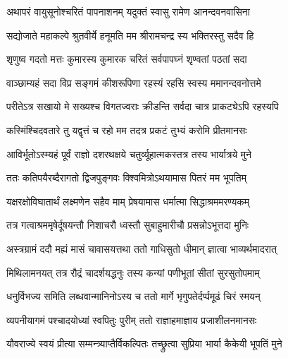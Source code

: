 

\translink{}

\storymeta



\twolineshloka
{अथापरं वायुसूनोश्चरितं पापनाशनम्}
{यदुक्तं स्वासु रामेण आनन्दवनवासिना}%

\twolineshloka
{सद्योजाते महाकल्पे श्रुतवीर्ये हनूमति}
{मम श्रीरामचन्द्र स्य भक्तिरस्तु सदैव हि}%

\twolineshloka
{शृणुष्व गदतो मत्तः कुमारस्य कुमारक}
{चरितं सर्वपापघ्नं शृण्वतां पठतां सदा}%

\twolineshloka
{वाञ्छाम्यहं सदा विप्र सङ्गमं कीशरूपिणा}
{रहस्यं रहसि स्वस्य ममानन्दवनोत्तमे}%

\twolineshloka
{परीतेऽत्र सखायो मे सख्यश्च विगतज्वराः}
{क्रीडन्ति सर्वदा चात्र प्राकट्येऽपि रहस्यपि}%

\twolineshloka
{कस्मिंश्चिदवतारे तु यद्वृत्तं च रहो मम}
{तदत्र प्रकटं तुभ्यं करोमि प्रीतमानसः}%

\twolineshloka
{आविर्भूतोऽस्म्यहं पूर्वं राज्ञो दशरथक्षये}
{चतुर्व्यूहात्मकस्तत्र तस्य भार्यात्रये मुने}%

\twolineshloka
{ततः कतिपयैरब्दैरागतो द्विजपुङ्गवः}
{क्श्विमित्रोऽथयामास पितरं मम भूपतिम्}%

\twolineshloka
{यक्षरक्षोविघातार्थं लक्ष्मणेन सहैव माम्}
{प्रेषयामास धर्मात्मा सिद्धाश्रममरण्यकम्}%

\twolineshloka
{तत्र गत्वाश्रममृषेर्दूषयन्तौ निशाचरौ}
{ध्वस्तौ सुबाहुमारीचौ प्रसन्नोऽभूत्तदा मुनिः}%

\twolineshloka
{अस्त्रग्रामं ददौ मह्यं मासं चावासयत्तथा}
{ततो गाधिसुतो धीमान् ज्ञात्वा भाव्यर्थमादरात्}%

\twolineshloka
{मिथिलामनयत् तत्र रौद्रं चादर्शयद्धनुः}
{तस्य कन्यां पणीभूतां सीतां सुरसुतोपमाम्}%

\twolineshloka
{धनुर्विभज्य समिति लब्धवान्मानिनोऽस्य च}
{ततो मार्गे भृगुपतेर्दर्प्पमूढं चिरं स्मयन्}%

\twolineshloka
{व्यपनीयागमं पश्चादयोध्यां स्वपितुः पुरीम्}
{ततो राज्ञाहमाज्ञाय प्रजाशीलनमानसः}%

\twolineshloka
{यौवराज्ये स्वयं प्रीत्या सम्मन्त्र्याप्तैर्विकल्पितः}
{तच्छ्रुत्वा सुप्रिया भार्या कैकेयी भूपतिं मुने}%

